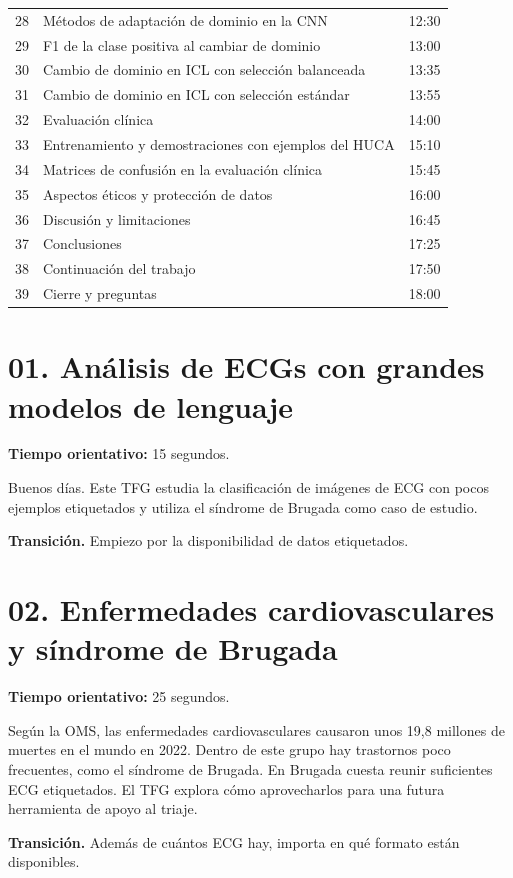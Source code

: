 \documentclass[11pt,a4paper]{article}
\begin{document}
\begin{longtable}{p{12mm}p{112mm}r}
28 & Métodos de adaptación de dominio en la CNN & 12:30\\
29 & F1 de la clase positiva al cambiar de dominio & 13:00\\
30 & Cambio de dominio en ICL con selección balanceada & 13:35\\
31 & Cambio de dominio en ICL con selección estándar & 13:55\\
32 & Evaluación clínica & 14:00\\
33 & Entrenamiento y demostraciones con ejemplos del HUCA & 15:10\\
34 & Matrices de confusión en la evaluación clínica & 15:45\\
35 & Aspectos éticos y protección de datos & 16:00\\
36 & Discusión y limitaciones & 16:45\\
37 & Conclusiones & 17:25\\
38 & Continuación del trabajo & 17:50\\
39 & Cierre y preguntas & 18:00\\
\bottomrule\end{longtable}
\section*{01. Análisis de ECGs con grandes modelos de lenguaje}
\textbf{Tiempo orientativo: }15 segundos.

Buenos días. Este TFG estudia la clasificación de imágenes de ECG con pocos ejemplos etiquetados y utiliza el síndrome de Brugada como caso de estudio.

\textbf{Transición.} Empiezo por la disponibilidad de datos etiquetados.

\section*{02. Enfermedades cardiovasculares y síndrome de Brugada}
\textbf{Tiempo orientativo: }25 segundos.

Según la OMS, las enfermedades cardiovasculares causaron unos 19,8 millones de muertes en el mundo en 2022. Dentro de este grupo hay trastornos poco frecuentes, como el síndrome de Brugada. En Brugada cuesta reunir suficientes ECG etiquetados. El TFG explora cómo aprovecharlos para una futura herramienta de apoyo al triaje.

\textbf{Transición.} Además de cuántos ECG hay, importa en qué formato están disponibles.
\end{document}
